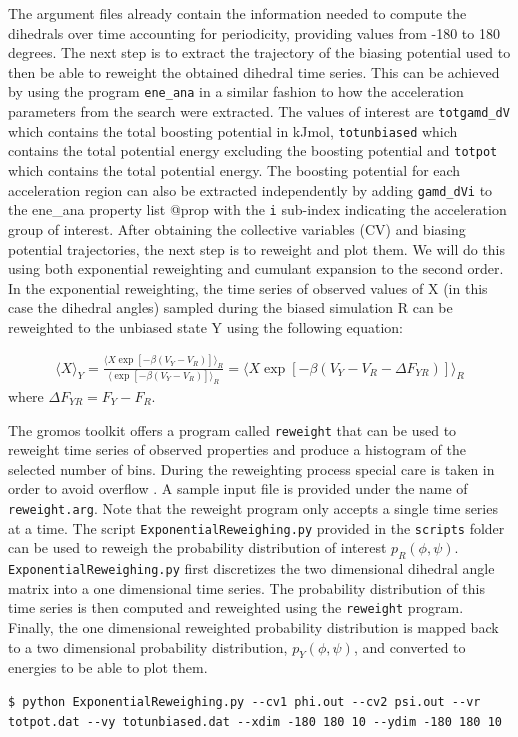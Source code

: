 The argument files already contain the information needed to compute the dihedrals over time accounting for periodicity, providing values from -180 to 180 degrees.
The next step is to extract the trajectory of the biasing potential used to then be able to reweight the obtained dihedral time series. This can be achieved by using the program \texttt{ene\_ana} in a similar fashion to how the acceleration parameters from the search were extracted. The values of interest are \texttt{totgamd\_dV} which contains the total boosting potential in kJ\/mol, \texttt{totunbiased} which contains the total potential energy excluding the boosting potential and \texttt{totpot} which contains the total potential energy. The boosting potential for each acceleration region can also be extracted independently by adding \texttt{gamd\_dVi} to the ene\_ana property list  @prop with the \texttt{i} sub-index indicating the acceleration group of interest.
After obtaining the collective variables (CV) and biasing potential trajectories, the next step is to reweight and plot them. We will do this using both exponential reweighting and cumulant expansion to the second order.
In the exponential reweighting, the time series of observed values of X (in this case the dihedral angles) sampled during the biased simulation R can be reweighted to the unbiased state Y using the following equation:

\begin{equation}
  \begin{aligned}
 \langle X \rangle_Y = \frac {\langle X \exp \left[-\beta \left (V_Y - V_R \right) \right] \rangle_R} {\langle \exp \left[-\beta \left (V_Y - V_R \right) \right] \rangle_R} = \langle X \exp \left[-\beta \left (V_Y - V_R -\Delta F_{YR} \right) \right] \rangle_R
\end{aligned}
\end{equation}
where $\Delta F_{YR} = F_{Y} - F_{R}$.

The gromos toolkit offers a program called \texttt{reweight} that can be used to reweight time series of observed properties and produce a histogram of the selected number of bins. During the reweighting process special care is taken in order to avoid overflow \cite{berg2003multicanonical}. A sample input file is provided under the name of \texttt{reweight.arg}. Note that the reweight program only accepts a single time series at a time. The script \texttt{ExponentialReweighing.py} provided in the \texttt{scripts} folder can be used to reweigh the probability distribution of interest $p_{R}(\phi, \psi)$. \texttt{ExponentialReweighing.py} first discretizes the two dimensional dihedral angle matrix into a one dimensional time series. The probability distribution of this time series is then computed and reweighted using the \texttt{reweight} program. Finally, the one dimensional reweighted probability distribution is mapped back to a two dimensional probability distribution, $p_{Y}(\phi, \psi)$, and converted to energies to be able to plot them.
 \begin{lstlisting}
$ python ExponentialReweighing.py --cv1 phi.out --cv2 psi.out --vr totpot.dat --vy totunbiased.dat --xdim -180 180 10 --ydim -180 180 10
\end{lstlisting}

